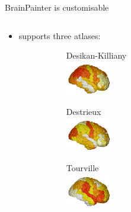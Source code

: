 \documentclass[10pt,xcolor=table,aspectratio=169]{beamer}
\begin{document}
\begin{frame}[t]{BrainPainter is customisable}



\begin{columns}[t]
\begin{column}{0.5\textwidth}


 \begin{itemize}
   \item supports three atlases:
   \begin{figure}
    \fontsize{8}{10}\selectfont
     \begin{subfigure}{0.27\textwidth}
      \centering
      Desikan-Killiany\\
      \includegraphics[height=1.5cm]{images/DK_output/Image_2_cortical-outer.png}
     \end{subfigure}
     \begin{subfigure}{0.27\textwidth}
      \centering
      Destrieux\\
      \includegraphics[height=1.5cm]{images/Destrieux_output/Image_2_cortical-outer.png}
     \end{subfigure}
     \begin{subfigure}{0.27\textwidth}
      \centering
      Tourville\\
      \includegraphics[height=1.5cm]{images/Tourville_output/Image_2_cortical-outer.png}
     \end{subfigure}

   \end{figure}
   
   \vspace{2em}
   

\end{itemize}
\end{column}
\end{columns}
\end{frame}
\end{document}
